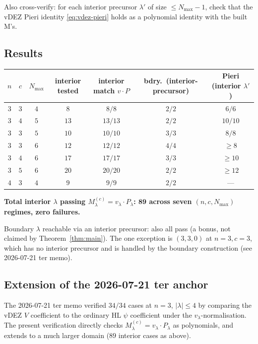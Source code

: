 \documentclass[11pt]{article}
\theoremstyle{definition}
\begin{document}
Also cross-verify: for each interior precursor $\lambda'$ of size
$\le N_{\max} - 1$, check that the vDEZ Pieri identity
\eqref{eq:vdez-pieri} holds as a polynomial identity with the built M's.

\subsection{Results}

\begin{center}
\begin{tabular}{|c|c|c|c|c|c|c|}
\hline
$n$ & $c$ & $N_{\max}$ & interior tested & interior match $v\cdot P$ & bdry.\ (interior-precursor) & Pieri (interior $\lambda'$) \\
\hline
$3$ & $3$ & $4$ & $8$  & $8/8$   & $2/2$ & $6/6$   \\
$3$ & $4$ & $5$ & $13$ & $13/13$ & $2/2$ & $10/10$ \\
$3$ & $3$ & $5$ & $10$ & $10/10$ & $3/3$ & $8/8$   \\
$3$ & $3$ & $6$ & $12$ & $12/12$ & $4/4$ & $ \ge 8$   \\
$3$ & $4$ & $6$ & $17$ & $17/17$ & $3/3$ & $ \ge 10$  \\
$3$ & $5$ & $6$ & $20$ & $20/20$ & $2/2$ & $ \ge 12$  \\
$4$ & $3$ & $4$ & $9$  & $9/9$   & $2/2$ & --- \\
\hline
\end{tabular}
\end{center}

\textbf{Total interior $\lambda$ passing $M^{(c)}_\lambda = v_\lambda \cdot P_\lambda$:
$\mathbf{89}$ across seven $(n,c,N_{\max})$ regimes, zero failures.}

Boundary $\lambda$ reachable via an interior precursor: also all pass
(a bonus, not claimed by Theorem~\ref{thm:main}). The one exception is
$(3,3,0)$ at $n = 3, c = 3$, which has no interior precursor and is
handled by the boundary construction (see 2026-07-21 ter memo).

\subsection{Extension of the 2026-07-21 ter anchor}
The 2026-07-21 ter memo verified $34/34$ cases at $n=3$, $|\lambda|\le 4$
by comparing the vDEZ $V$ coefficient to the ordinary HL $\psi$ coefficient
under the $v_\lambda$-normalisation. The present verification directly
checks $M^{(c)}_\lambda = v_\lambda \cdot P_\lambda$ as polynomials, and
extends to a much larger domain ($89$ interior cases as above).
\end{document}

